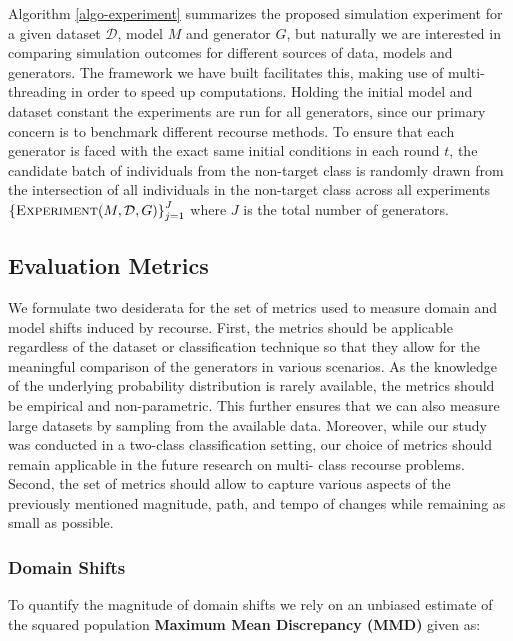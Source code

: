 \documentclass[conference,final,]{IEEEtran}
\begin{document}
Algorithm \ref{algo-experiment} summarizes the proposed simulation experiment for a given dataset \(\mathcal{D}\), model \(M\) and generator \(G\), but naturally we are interested in comparing simulation outcomes for different sources of data, models and generators. The framework we have built facilitates this, making use of multi-threading in order to speed up computations. Holding the initial model and dataset constant the experiments are run for all generators, since our primary concern is to benchmark different recourse methods. To ensure that each generator is faced with the exact same initial conditions in each round \(t\), the candidate batch of individuals from the non-target class is randomly drawn from the intersection of all individuals in the non-target class across all experiments \(\left\{\textsc{Experiment}(M,\mathcal{D},G)\right\}_{j=1}^J\) where \(J\) is the total number of generators.

\hypertarget{method-2-metrics}{%
\subsection{Evaluation Metrics}\label{method-2-metrics}}

We formulate two desiderata for the set of metrics used to measure domain and model shifts induced by recourse. First, the metrics should be applicable regardless of the dataset or classification technique so that they allow for the meaningful comparison of the generators in various scenarios. As the knowledge of the underlying probability distribution is rarely available, the metrics should be empirical and non-parametric. This further ensures that we can also measure large datasets by sampling from the available data. Moreover, while our study was conducted in a two-class classification setting, our choice of metrics should remain applicable in the future research on multi- class recourse problems. Second, the set of metrics should allow to capture various aspects of the previously mentioned magnitude, path, and tempo of changes while remaining as small as possible.

\hypertarget{domain-shifts}{%
\subsubsection{Domain Shifts}\label{domain-shifts}}

To quantify the magnitude of domain shifts we rely on an unbiased estimate of the squared population \textbf{Maximum Mean Discrepancy (MMD)} given as:
\end{document}
